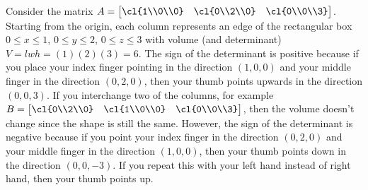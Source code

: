 \begin{example}
Consider the matrix $A = \begin{bmatrix}\cl{1\\0\\0}&\cl{0\\2\\0}&\cl{0\\0\\3}\end{bmatrix}$.  Starting from the origin, each column represents an edge of the rectangular box 
$0\leq x\leq 1$, 
$0\leq y\leq 2$, 
$0\leq z\leq 3$ with volume (and determinant) $V=lwh=(1)(2)(3)=6$. The sign of the determinant is positive because if you place your index finger pointing in the direction $(1,0,0)$ and your middle finger in the direction $(0,2,0)$, then your thumb points upwards in the direction $(0,0,3)$. 
If you interchange two of the columns, for example 
$B = \begin{bmatrix}\cl{0\\2\\0}&\cl{1\\0\\0}&\cl{0\\0\\3}\end{bmatrix}$, then the volume doesn't change since the shape is still the same. However, the sign of the determinant is negative because if you point your index finger in the direction $(0,2,0)$ and your middle finger in the direction $(1,0,0)$, then your thumb points down in the direction $(0,0,-3)$. If you repeat this with your left hand instead of right hand, then your thumb points up.
\end{example}

